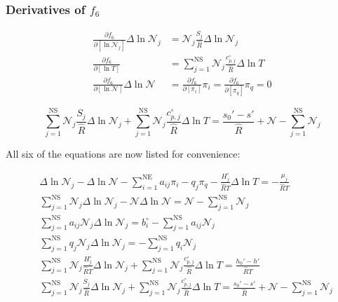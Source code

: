 \documentclass[10pt]{article}
\begin{document}
\begin{flushleft}
\subsubsection{Derivatives of $f_6$}

\begin{align}
    \frac{\partial f_6}{\partial [\ln{\mathcal{N}_j}]} \Delta \ln \mathcal{N}_j &= \mathcal{N}_j \frac{S_j}{\hat{R}} \Delta \ln \mathcal{N}_j
    \\ \frac{\partial f_6}{\partial [\ln T]} &= \sum_{j=1}^\text{NS} \mathcal{N}_j \frac{c_{p,j}^\circ}{\hat{R}} \Delta \ln T
    \\ \frac{\partial f_6}{\partial [\ln \mathcal{N}]} \Delta\ln \mathcal{N} &= \frac{\partial f_6}{\partial [\pi_i]} \pi_i = \frac{\partial f_6}{\partial [\pi_q]} \pi_q = 0
\end{align}

\begin{equation*}
    \boxed{\sum_{j=1}^\text{NS} \mathcal{N}_j \frac{S_j}{\hat{R}} \Delta \ln \mathcal{N}_j + \sum_{j=1}^\text{NS} \mathcal{N}_j \frac{c_{p,j}^\circ}{\hat{R}} \Delta \ln T = \frac{s_0' - s'}{\hat{R}} + \mathcal{N} - \sum_{j=1}^\text{NS} \mathcal{N}_j }
\end{equation*}

All six of the equations are now listed for convenience:

\begin{align}
    &\Delta\ln{\mathcal{N}_j} - \Delta \ln{\mathcal{N}} - \sum_{i=1}^\text{NE} a_{ij}\pi_i - q_j \pi_q -  \frac{H_j^\circ}{\hat{R}T} \Delta \ln T = -\frac{\mu_j}{\hat{R}T}
    \label{GlnNj}
    \\ &\sum_{j=1}^\text{NS} \mathcal{N}_j \Delta \ln \mathcal{N}_j - \mathcal{N} \Delta \ln \mathcal{N} = \mathcal{N} - \sum_{j=1}^\text{NS} \mathcal{N}_j
    \label{GlnN}
    \\ &\sum_{j=1}^\text{NS} a_{ij} \mathcal{N}_j \Delta \ln \mathcal{N}_j = b_i^\circ - \sum_{j=1}^\text{NS} a_{ij} \mathcal{N}_j
    \label{Gpii}
    \\ &\sum_{j=1}^\text{NS} q_j \mathcal{N}_j \Delta \ln \mathcal{N}_j = - \sum_{j=1}^\text{NS} q_i \mathcal{N}_j
    \label{Gpiq}
    \\ &\sum_{j=1}^\text{NS} \mathcal{N}_j \frac{H_j^\circ}{\hat{R}T} \Delta \ln \mathcal{N}_j +  \sum_{j=1}^\text{NS} \mathcal{N}_j \frac{c_{p,j}^\circ}{\hat{R}} \Delta \ln T = \frac{h_0' - h'}{\hat{R}T}
    \label{GdlnTH}
    \\ &\sum_{j=1}^\text{NS} \mathcal{N}_j \frac{S_j}{\hat{R}} \Delta \ln \mathcal{N}_j + \sum_{j=1}^\text{NS} \mathcal{N}_j \frac{c_{p,j}^\circ}{\hat{R}} \Delta \ln T = \frac{s_0' - s'}{\hat{R}} + \mathcal{N} - \sum_{j=1}^\text{NS} \mathcal{N}_j 
    \label{GdlnTS}
\end{align}



\end{flushleft}
\end{document}

